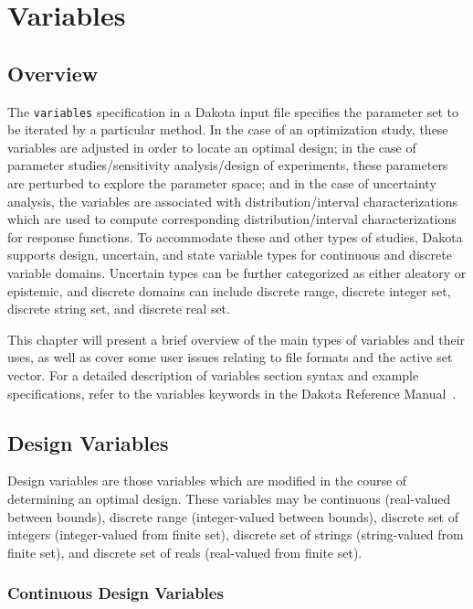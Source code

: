 \chapter{Variables}\label{variables}

\section{Overview}\label{variables:overview}

The \texttt{variables} specification in a Dakota input file specifies
the parameter set to be iterated by a particular method. In the case
of an optimization study, these variables are adjusted in order to
locate an optimal design; in the case of parameter studies/sensitivity
analysis/design of experiments, these parameters are perturbed to
explore the parameter space; and in the case of uncertainty analysis,
the variables are associated with distribution/interval
characterizations which are used to compute corresponding
distribution/interval characterizations for response functions. To
accommodate these and other types of studies, Dakota supports design,
uncertain, and state variable types for continuous and discrete
variable domains.  Uncertain types can be further categorized as
either aleatory or epistemic, and discrete domains can include
discrete range, discrete integer set, discrete string set, and
discrete real set.

This chapter will present a brief overview of the main types of
variables and their uses, as well as cover some user issues relating
to file formats and the active set vector.  For a detailed description
of variables section syntax and example specifications, refer to the
variables keywords in the Dakota Reference Manual~\cite{RefMan}.


\section{Design Variables}\label{variables:design}

Design variables are those variables which are modified in the course
of determining an optimal design. These variables may be continuous
(real-valued between bounds), discrete range (integer-valued between
bounds), discrete set of integers (integer-valued from finite set),
discrete set of strings (string-valued from finite set), and discrete
set of reals (real-valued from finite set).

\subsection{Continuous Design Variables}\label{variables:design:cdv}

